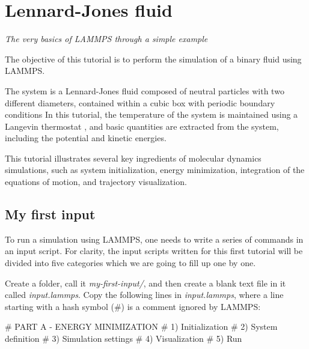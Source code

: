 \chapter{Lennard-Jones fluid}
\label{lennard-jones-label}

\noindent \vspace{-1cm} \noindent \textcolor{graytitle}{\textit{{\Large The very basics of LAMMPS through a simple example}}\vspace{0.5cm} }

\vspace{0.25cm} \noindent The objective of this tutorial is to perform
the simulation of a binary fluid using LAMMPS.

\vspace{0.25cm} \noindent The system is a Lennard-Jones fluid composed of neutral particles with two
different diameters, contained within a cubic box with periodic boundary conditions 
In this tutorial, the temperature of the system is
maintained using a Langevin thermostat \cite{schneider1978molecular}, and
basic quantities are extracted from the system, including the potential and
kinetic energies. 

\vspace{0.25cm} \noindent This tutorial illustrates several key ingredients of
molecular dynamics simulations, such as system initialization,
energy minimization, integration of the equations of motion,
and trajectory visualization.

\section{My first input}
\noindent To run a simulation using LAMMPS, one needs to write a series of commands
in an input script. For clarity, the input scripts written for this first
tutorial will be divided into five categories which we are going to fill up
one by one. 

\vspace{0.25cm} \noindent Create a folder, call it \textit{my-first-input/}, and then create a blank
text file in it called \textit{input.lammps}. Copy the following lines
in \textit{input.lammps}, where a line starting with a hash symbol ($\#$)
is a comment ignored by LAMMPS:

\begin{lcverbatim}
# PART A - ENERGY MINIMIZATION
# 1) Initialization
# 2) System definition
# 3) Simulation settings
# 4) Visualization
# 5) Run
\end{lcverbatim}

